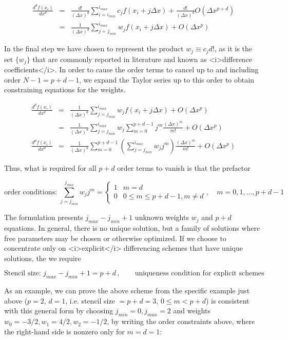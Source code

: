 \documentclass[12pt]{article}
\begin{document}
\begin{eqnarray*}
\frac{d^d f(x_i)}{dx^d} & = &\frac{d!}{(\Delta x)^d}\sum_{i = i_{min}}^{i_{max}} c_j f(x_i + j\Delta x) + \frac{d!}{(\Delta x)^d}O(\Delta x^{p + d})\\
& = &\frac{1}{(\Delta x)^d}\sum_{j = j_{min}}^{i_{max}} w_jf(x_i + j\Delta x) + O(\Delta x^p)
\end{eqnarray*}

In the final step we have chosen to represent the product $w_j \equiv c_j d!$, as it is the set $\{w_j\}$ that are commonly reported in literature and known as <i>difference coefficients</i>. In order to cause the order terms to cancel up to and including order $N - 1 = p + d - 1$, we expand the Taylor series up to this order to obtain constraining equations for the weights. 

\begin{eqnarray*}
\frac{d^d f(x_i)}{dx^d} & = &\frac{1}{(\Delta x)^d}\sum_{j = j_{min}}^{i_{max}} w_j f(x_i + j\Delta x) + O(\Delta x^p) \\
 & = &\frac{1}{(\Delta x)^d}\sum_{j = j_{min}}^{i_{max}} w_j\sum_{m = 0}^{p + d - 1} j^m \frac{(\Delta x)^m}{m!} + O(\Delta x^p) \\
\frac{d^d f(x_i)}{dx^d} & = & \frac{1}{(\Delta x)^d}\sum_{m = 0}^{p + d - 1}\left(\sum_{j = j_{min}}^{i_{max}} w_j j^m\right) \frac{(\Delta x)^m}{m!} + O(\Delta x^p) 
\end{eqnarray*}

Thus, what is required for all $p + d$ order terms to vanish is that the prefactor 

$$\boxed{\text{order conditions}}: \, \sum_{j = j_{min}}^{j_{max}} w_j j^m  = \begin{cases} 
      1 & m = d \\
      0 & 0 \leq m \leq p + d - 1, m \neq d
   \end{cases}, \quad m = 0, 1, \ldots , p + d - 1$$

The formulation presents $j_{max} - j_{min} + 1$ unknown weights $w_j$ and $p + d$ equations. In general, there is no unique solution, but a family of solutions where free parameters may be chosen or otherwise optimized. If we choose to concentrate only on <i>explicit</i> differencing schemes that have unique solutions, the we require

$$\boxed{\text{Stencil size}}:\,  j_{max} - j_{min} + 1 = p + d \, , \qquad \text{uniqueness condition for explicit schemes}$$

As an example, we can prove the above scheme from the specific example just above ($p = 2$, $d = 1$, i.e. stencil size $= p + d = 3$, $0 \leq m < p + d$) is consistent with this general form by choosing $j_{min} = 0, j_{max} = 2$ and weights $w_0 = -3/2, w_1 = 4/2, w_2 = -1/2$, by writing the order constraints above, where the right-hand side is nonzero only for $m = d = 1$:
\end{document}
